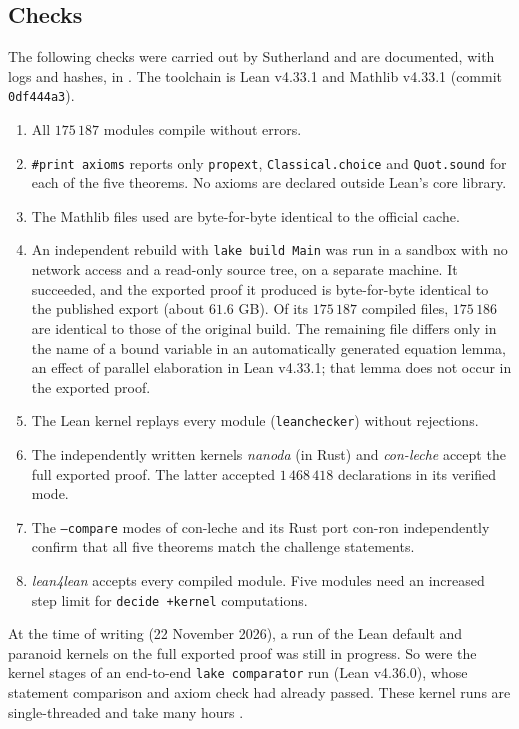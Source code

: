 \subsection{Checks}
The following checks were carried out by Sutherland and are documented, with logs and hashes, in
\cite{Sutherland2026}. The toolchain is Lean v4.33.1 and Mathlib v4.33.1 (commit \texttt{0df444a3}).
\begin{enumerate}[label=(\arabic*)]
\item All $175\,187$ modules compile without errors.
\item \verb|#print axioms| reports only \texttt{propext}, \texttt{Classical.choice} and
\texttt{Quot.sound} for each of the five theorems. No axioms are declared outside Lean's core library.
\item The Mathlib files used are byte-for-byte identical to the official cache.
\item An independent rebuild with \texttt{lake build Main} was run in a sandbox with no network access
and a read-only source tree, on a separate machine. It succeeded, and the exported proof it produced
is byte-for-byte identical to the published export (about $61.6$ GB). Of its $175\,187$ compiled
files, $175\,186$ are identical to those of the original build. The remaining file differs only in the
name of a bound variable in an automatically generated equation lemma, an effect of parallel
elaboration in Lean v4.33.1; that lemma does not occur in the exported proof.
\item The Lean kernel replays every module (\texttt{leanchecker}) without rejections.
\item The independently written kernels \emph{nanoda} (in Rust) and \emph{con-leche} accept the full
exported proof. The latter accepted $1\,468\,418$ declarations in its verified mode.
\item The \texttt{--compare} modes of con-leche and its Rust port con-ron independently confirm that all
five theorems match the challenge statements.
\item \emph{lean4lean} accepts every compiled module. Five modules need an increased step limit for
\texttt{decide +kernel} computations.
\end{enumerate}
At the time of writing (22 November 2026), a run of the Lean default and paranoid kernels on the full
exported proof was still in progress. So were the kernel stages of an end-to-end
\texttt{lake comparator} run (Lean v4.36.0), whose statement comparison and axiom check had already
passed. These kernel runs are single-threaded and take many hours \cite{Sutherland2026}.

